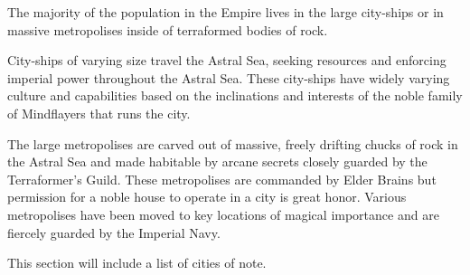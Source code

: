 The majority of the population in the Empire lives in the large city-ships or in massive metropolises inside of terraformed bodies of rock.

City-ships of varying size travel the Astral Sea, seeking resources and enforcing imperial power throughout the Astral Sea.
These city-ships have widely varying culture and capabilities based on the inclinations and interests of the noble family of Mindflayers that runs the city.

The large metropolises are carved out of massive, freely drifting chucks of rock in the Astral Sea and made habitable by arcane secrets closely guarded by the Terraformer's Guild.
These metropolises are commanded by Elder Brains but permission for a noble house to operate in a city is great honor.
Various metropolises have been moved to key locations of magical importance and are fiercely guarded by the Imperial Navy.

This section will include a list of cities of note.
